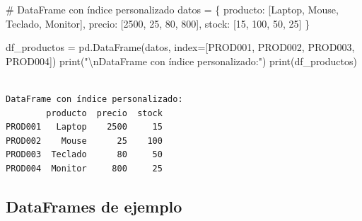\documentclass[
  doc,
  floatsintext,
  longtable,
  a4paper,
  nolmodern,
  notxfonts,
  notimes,
  12pt,
  colorlinks=true,linkcolor=blue,citecolor=blue,urlcolor=blue]{apa7}
\newenvironment{Shaded}{\begin{snugshade}}{\end{snugshade}}
\newcommand{\BuiltInTok}[1]{\textcolor[rgb]{0.00,0.23,0.31}{#1}}
\newcommand{\CharTok}[1]{\textcolor[rgb]{0.13,0.47,0.30}{#1}}
\newcommand{\CommentTok}[1]{\textcolor[rgb]{0.37,0.37,0.37}{#1}}
\newcommand{\DecValTok}[1]{\textcolor[rgb]{0.68,0.00,0.00}{#1}}
\newcommand{\NormalTok}[1]{\textcolor[rgb]{0.00,0.23,0.31}{#1}}
\newcommand{\OperatorTok}[1]{\textcolor[rgb]{0.37,0.37,0.37}{#1}}
\newcommand{\StringTok}[1]{\textcolor[rgb]{0.13,0.47,0.30}{#1}}
\begin{document}
\begin{Shaded}
\begin{Highlighting}[]
\CommentTok{\# DataFrame con índice personalizado}
\NormalTok{datos }\OperatorTok{=}\NormalTok{ \{}
    \StringTok{\textquotesingle{}producto\textquotesingle{}}\NormalTok{: [}\StringTok{\textquotesingle{}Laptop\textquotesingle{}}\NormalTok{, }\StringTok{\textquotesingle{}Mouse\textquotesingle{}}\NormalTok{, }\StringTok{\textquotesingle{}Teclado\textquotesingle{}}\NormalTok{, }\StringTok{\textquotesingle{}Monitor\textquotesingle{}}\NormalTok{],}
    \StringTok{\textquotesingle{}precio\textquotesingle{}}\NormalTok{: [}\DecValTok{2500}\NormalTok{, }\DecValTok{25}\NormalTok{, }\DecValTok{80}\NormalTok{, }\DecValTok{800}\NormalTok{],}
    \StringTok{\textquotesingle{}stock\textquotesingle{}}\NormalTok{: [}\DecValTok{15}\NormalTok{, }\DecValTok{100}\NormalTok{, }\DecValTok{50}\NormalTok{, }\DecValTok{25}\NormalTok{]}
\NormalTok{\}}

\NormalTok{df\_productos }\OperatorTok{=}\NormalTok{ pd.DataFrame(datos, index}\OperatorTok{=}\NormalTok{[}\StringTok{\textquotesingle{}PROD001\textquotesingle{}}\NormalTok{, }\StringTok{\textquotesingle{}PROD002\textquotesingle{}}\NormalTok{, }\StringTok{\textquotesingle{}PROD003\textquotesingle{}}\NormalTok{, }\StringTok{\textquotesingle{}PROD004\textquotesingle{}}\NormalTok{])}
\BuiltInTok{print}\NormalTok{(}\StringTok{"}\CharTok{\textbackslash{}n}\StringTok{DataFrame con índice personalizado:"}\NormalTok{)}
\BuiltInTok{print}\NormalTok{(df\_productos)}
\end{Highlighting}
\end{Shaded}

\begin{verbatim}

DataFrame con índice personalizado:
        producto  precio  stock
PROD001   Laptop    2500     15
PROD002    Mouse      25    100
PROD003  Teclado      80     50
PROD004  Monitor     800     25
\end{verbatim}

\subsection{DataFrames de ejemplo}\label{dataframes-de-ejemplo}
\end{document}
